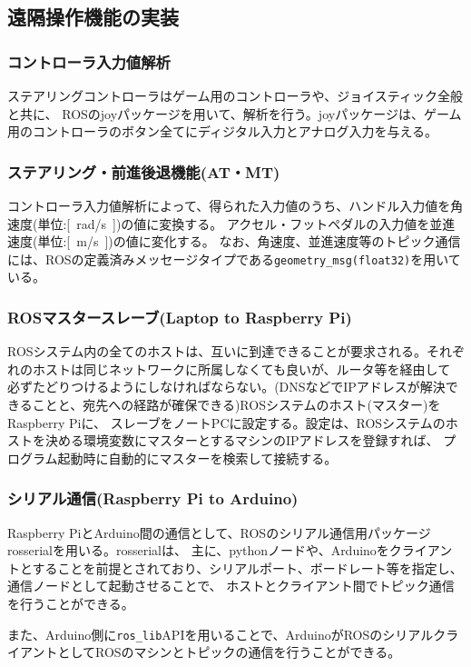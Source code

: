 \clearpage

\subsection{遠隔操作機能の実装}
\subsubsection{コントローラ入力値解析}
ステアリングコントローラはゲーム用のコントローラや、ジョイスティック全般と共に、
ROSのjoyパッケージを用いて、解析を行う。joyパッケージは、ゲーム用のコントローラのボタン全てにディジタル入力とアナログ入力を与える。

\subsubsection{ステアリング・前進後退機能(AT・MT)}
コントローラ入力値解析によって、得られた入力値のうち、ハンドル入力値を角速度(単位:\si{[rad/s]})の値に変換する。
アクセル・フットペダルの入力値を並進速度(単位:\si{[m/s]})の値に変化する。
なお、角速度、並進速度等のトピック通信には、ROSの定義済みメッセージタイプである\verb|geometry_msg(float32)|を用いている。

\subsubsection{ROSマスタースレーブ(Laptop to Raspberry Pi)}
ROSシステム内の全てのホストは、互いに到達できることが要求される。それぞれのホストは同じネットワークに所属しなくても良いが、ルータ等を経由して
必ずたどりつけるようにしなければならない。(DNSなどでIPアドレスが解決できることと、宛先への経路が確保できる)ROSシステムのホスト(マスター)をRaspberry Piに、
スレーブをノートPCに設定する。設定は、ROSシステムのホストを決める環境変数にマスターとするマシンのIPアドレスを登録すれば、
プログラム起動時に自動的にマスターを検索して接続する。

\subsubsection{シリアル通信(Raspberry Pi to Arduino)}
Raspberry PiとArduino間の通信として、ROSのシリアル通信用パッケージrosserialを用いる。rosserialは、
主に、pythonノードや、Arduinoをクライアントとすることを前提とされており、シリアルポート、ボードレート等を指定し、通信ノードとして起動させることで、
ホストとクライアント間でトピック通信を行うことができる。

また、Arduino側に\verb|ros_lib|APIを用いることで、ArduinoがROSのシリアルクライアントとしてROSのマシンとトピックの通信を行うことができる。

